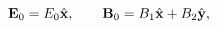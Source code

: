 \begin{equation} \label{e1b12}
{\bf E}_0 = E_0 \hat{\bf x}, \qquad 
{\bf B}_0 = B_1 \hat{\bf x} + B_2 \hat{\bf y},
\end{equation} 
